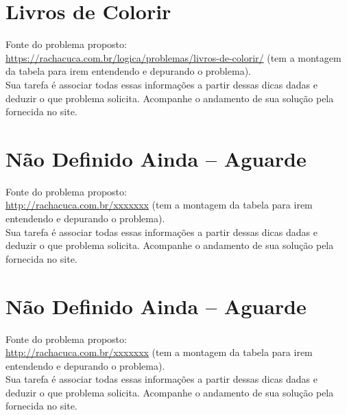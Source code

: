 \documentclass[a4paper,12pt]{article}
\begin{document}
\newpage
\tableofcontents


\newpage
\section{Livros de Colorir}

 Fonte do problema proposto:\\
 \url{https://rachacuca.com.br/logica/problemas/livros-de-colorir/}
 (tem a montagem da tabela para irem entendendo e depurando o problema).\\


\vspace{1.5cm}
 Sua tarefa é associar todas essas informações a partir dessas dicas dadas e deduzir o que problema solicita. Acompanhe o andamento de sua solução pela fornecida no site.
\newpage
\section{Não Definido Ainda -- Aguarde}

 Fonte do problema proposto:\\
 \url{http://rachacuca.com.br/xxxxxxx}
 (tem a montagem da tabela para irem entendendo e depurando o problema).\\


\vspace{1.5cm}
 Sua tarefa é associar todas essas informações a partir dessas dicas dadas e deduzir o que problema solicita. Acompanhe o andamento de sua solução pela fornecida no site.
\newpage
\section{Não Definido Ainda -- Aguarde}

 Fonte do problema proposto:\\
 \url{http://rachacuca.com.br/xxxxxxx}
 (tem a montagem da tabela para irem entendendo e depurando o problema).\\

\vspace{1.5cm}
 Sua tarefa é associar todas essas informações a partir dessas dicas dadas e deduzir o que problema solicita. Acompanhe o andamento de sua solução pela fornecida no site.
\end{document}
